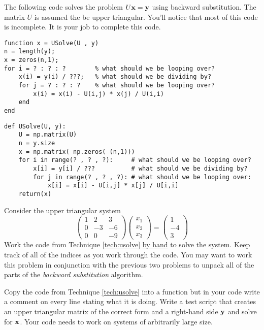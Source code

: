 \begin{technique}\label{tech:usolve}
    The following code solves the problem $U {\bf x} = {\bf y}$ using backward
    substitution.  The matrix $U$ is assumed the be upper triangular.  You'll notice that
    most of this code is incomplete.  It is your job to complete this code.

\bcode
\ifnum{}
\begin{lstlisting}
function x = USolve(U , y)
n = length(y);
x = zeros(n,1);
for i = ? : ? : ?        % what should we be looping over?
    x(i) = y(i) / ???;   % what should we be dividing by?
    for j = ? : ? : ?    % what should we be looping over? 
        x(i) = x(i) - U(i,j) * x(j) / U(i,i)
    end
end
\end{lstlisting}
\else
\begin{lstlisting}
def USolve(U, y):
    U = np.matrix(U)
    n = y.size
    x = np.matrix( np.zeros( (n,1)))
    for i in range(? , ? , ?):     # what should we be looping over?
        x[i] = y[i] / ???          # what should we be dividing by?
        for j in range(? , ? , ?): # what should we be looping over:
            x[i] = x[i] - U[i,j] * x[j] / U[i,i]
    return(x)
\end{lstlisting}
\fi
\end{technique}

\begin{problem}
    Consider the upper triangular system
    \[ \begin{pmatrix} 1 & 2 & 3 \\ 0 & -3 & -6 \\ 0 & 0 & -9 \end{pmatrix}
        \begin{pmatrix} x_1 \\ x_2 \\ x_3 \end{pmatrix} = \begin{pmatrix} 1 \\ -4 \\
        3\end{pmatrix} \]
    Work the code from Technique \ref{tech:usolve} \underline{by hand} to solve the
    system.  Keep track of all of the indices as you work through the code.  You may want
    to work this problem in conjunction with the previous two problems to unpack all of
    the parts of the {\it backward substitution} algorithm.
\end{problem}

\begin{problem}
    Copy the code from Technique \ref{tech:usolve} into a \ProgLang function but in your code
    write a comment on every line stating what it is doing.  Write a test script that
    creates an upper triangular matrix of the correct form and a right-hand side ${\bf y}$ and
    solve for ${\bf x}$.  Your code needs to work on systems of arbitrarily large size.
\end{problem}

